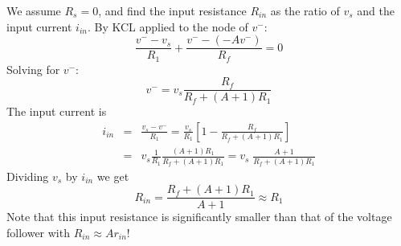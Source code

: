 \documentclass{article}
\begin{document}
\begin{itemize}
\begin{itemize}
      We assume $R_s=0$, and find the input resistance $R_{in}$ as the
      ratio of $v_s$ and the input current $i_{in}$. By KCL applied to 
      the node of $v^-$:
      \begin{equation}
        \frac{v^--v_s}{R_1}+\frac{v^--(-Av^-)}{R_f}=0 
      \end{equation}
      Solving for $v^-$:
      \begin{equation}
        v^-=v_s\frac{R_f}{R_f+(A+1)R_1} 
      \end{equation}
      The input current is
      \begin{eqnarray}
	i_{in}&=&\frac{v_s-v^-}{R_1}
        =\frac{v_s}{R_1}\left[1-\frac{R_f}{R_f+(A+1)R_1}\right]
	\nonumber \\
	&=&v_s\frac{1}{R_1}\frac{(A+1)R_1}{R_f+(A+1) R_1}
        =v_s\;\frac{A+1}{R_f+(A+1) R_1}
      \end{eqnarray}
      Dividing $v_s$ by $i_{in}$ we get
      \begin{equation}
        R_{in}=\frac{R_f+(A+1) R_1}{A+1}\approx R_1
      \end{equation}
      Note that this input resistance is significantly smaller
      than that of the voltage follower with $R_{in}\approx A r_{in}$!
      
    \begin{comment}
    \item {\bf Input resistance:} 

      We assume $R_s=0$, and find the input resistance $R_{in}$ as the
      ratio of $v_s$ and the input current $i_{in}$. By KCL applied to 
      the node of $v^-$:
      \begin{equation}
        \frac{v^--v_s}{R_1}+\frac{v^-}{r_{in}}+\frac{v^--(-Av^-)}{R_f+r_{out}}=0 
      \end{equation}
      Solving for $v^-$:
      \begin{equation}
        v^-=v_s\frac{r_{in}(R_f+r_{out})}{(R_1+r_{in})(R_f+r_{out})+(A+1)R_1r_{in}} 
      \end{equation}
      The input current is
      \begin{eqnarray}
	i_{in}&=&\frac{v_s-v^-}{R_1}
        =\frac{v_s}{R_1}\left[1-\frac{r_{in}(R_f+r_{out})}{(R_1+r_{in})(R_f+r_{out})
            +(A+1)R_1r_{in}}\right] 
	\nonumber \\
	&=&v_s\frac{R_f+r_{out}+(A+1)r_{in}}{(R_1+r_{in})(R_f+r_{out})+(A+1)R_1r_{in}} 
      \end{eqnarray}
      Dividing $v_s$ by $i_{in}$ we get
      \begin{eqnarray}
      R_{in}&=&\frac{v_s}{i_{in}}
      =\frac{[R_f+r_{out}+(A+1)R_1]r_{in}+R_1(R_f+r_{out})}{R_f+r_{out}+(A+1)r_{in}} 
      \nonumber\\
      &\approx&\frac{(R_f+A\,R_1)r_{in}+R_1R_f}{R_f+A\,r_{in}} 
      \approx \frac{A\,R_1\,r_{in}}{A\,r_{in}}=R_1 
      \end{eqnarray}
      The first approximation is based on $r_{out}\ll R_1,\,R_f$ and $A\gg 1$,
      the second approximation is based on $A\,r_{in}\gg R_1,\,R_f$.
    \end{comment}


\end{itemize}
\end{itemize}
\end{document}
